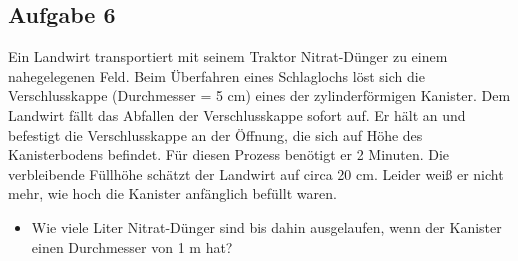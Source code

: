 \documentclass[a4paper,11pt]{article}
\newif\ifshowme
\begin{document}
\begin{marginfigure}[+2cm]



\ifshowme
\antwort{

Kritische Reynoldszahl für turbulente oder laminare Strömung:
\begin{equation}
\text{Re}_{\text{krit}} = \frac{\rho \cdot d \cdot v}{\eta} = 2.300
\end{equation}


Einsetzen:
\begin{align*}
&\text{a)} && \frac{999,8\mskip3mu \kg/\m^3 \cdot 0,3\mskip3mu \m \cdot 0,05\mskip3mu \m/\s}{1.790 \cdot 10^{-6}\mskip3mu \text{P} \cdot \s} &&\approx 8.378 \\
&\text{b)} && \frac{999,8\mskip3mu \kg/\m^3 \cdot 0,3\mskip3mu \m \cdot 0,01\mskip3mu \m/\s}{1.790 \cdot 10^{-6}\mskip3mu \text{P} \cdot \s} &&\approx 1.676 \\
&\text{c)} && \frac{999,8\mskip3mu \kg/\m^3 \cdot 0,1\mskip3mu \m \cdot 0,05\mskip3mu \m/\s}{1.790 \cdot 10^{-6}\mskip3mu \text{P} \cdot \s} &&\approx 2.793 \\
\end{align*}

Oberhalb der kritischen Reynolds-Zahl 2.300 erfolgt der Übergang zu turbulenten Strömungen.
}
\pagebreak
\else
\fi


\subsection*{Aufgabe 6}
Ein Landwirt transportiert mit seinem Traktor Nitrat-Dünger zu einem nahegelegenen Feld. Beim Überfahren eines Schlaglochs löst sich die Verschlusskappe (Durchmesser = 5 cm) eines der zylinderförmigen Kanister. Dem Landwirt fällt das Abfallen der Verschlusskappe sofort auf. Er hält an und befestigt die Verschlusskappe an der Öffnung, die sich auf Höhe des Kanisterbodens befindet. Für diesen Prozess benötigt er 2 Minuten. Die verbleibende Füllhöhe schätzt der Landwirt auf circa 20 cm. Leider weiß er nicht mehr, wie hoch die Kanister anfänglich befüllt waren.\par
\begin{itemize}
\item Wie viele Liter Nitrat-Dünger sind bis dahin ausgelaufen, wenn der Kanister einen Durchmesser von 1 m hat? 
\end{itemize} 




\end{marginfigure}
\end{document}
